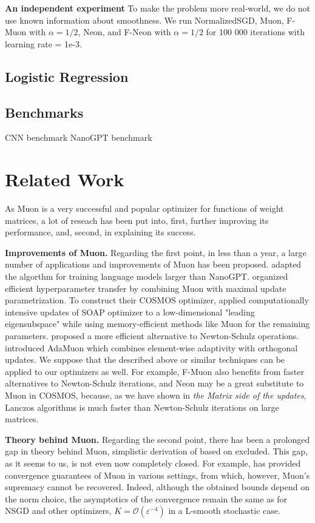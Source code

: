 \documentclass{article} %
\renewcommand{\epsilon}{\varepsilon}
\newcommand{\cO}{\mathcal{O}}
\begin{document}
    {\bf An independent experiment}
    To make the problem more real-world, we do not use known information about smoothness. We run NormalizedSGD, Muon, F-Muon with $\alpha=1/2$, Neon, and F-Neon with $\alpha=1/2$ for 100 000 iterations with learning rate = 1e-3.
    
    \subsection{Logistic Regression}
    \subsection{Benchmarks}
    CNN benchmark
    NanoGPT benchmark

\section{Related Work}
As Muon \cite{jordan2024muon} is a very successful and popular optimizer for functions of weight matrices, a lot of reseach has been put into, first, further improving its performance, and, second, in explaining its success.

{\bf Improvements of Muon.} Regarding the first point, in less than a year, a large number of applications and improvements of Muon has been proposed. \cite{liu2025muon} adapted the algorthm for training language models larger than NanoGPT. \cite{shah2025practical} organized efficient hyperparameter transfer by combining Muon with maximal update parametrization. To construct their COSMOS optimizer, \cite{chen2025cosmoshybridadaptive} applied computationally intensive updates of SOAP optimizer to a low-dimensional "leading eigensubspace" while using memory-efficient methods like Muon for the remaining parameters. \cite{amsel2025polar} proposed a more efficient alternative to Newton-Schulz operations. \cite{si2025adamuon} introduced AdaMuon which combines element-wise adaptivity with orthogonal updates. We suppose that the described above or similar techniques can be applied to our optimizers as well. For example, F-Muon also benefits from faster alternatives to Newton-Schulz iterations, and Neon may be a great substitute to Muon in COSMOS, because, as we have shown in {\it the Matrix side of the updates}, Lanczos algorithms is much faster than Newton-Schulz iterations on large matrices.

{\bf Theory behind Muon.} Regarding the second point, there has been a prolonged gap in theory behind Muon, simplistic derivation of \cite{bernstein2025deriving} based on \cite{bernstein2024oldoptimizernewnorm} excluded. This gap, as it seems to us, is not even now completely closed. For example, \cite{kovalev2025understanding} has provided convergence guarantees of Muon in various settings, from which, however, Muon's supremacy cannot be recovered. Indeed, although the obtained bounds depend on the norm choice, the asymptotics of the convergence remain the same as for NSGD and other optimizers, $K = \cO(\epsilon^{-4})$ in a L-smooth stochastic case.
\end{document}
